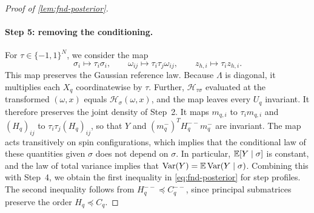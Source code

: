 \begin{proof}[Proof of \cref{lem:fnd-posterior}]
\paragraph{Step 5: removing the conditioning.}
For $\tau\in\{-1,1\}^N$, we consider the map
\[
 \sigma_i\mapsto\tau_i\sigma_i,\qquad
 \omega_{ij}\mapsto\tau_i\tau_j\omega_{ij},\qquad
 z_{h,i}\mapsto\tau_iz_{h,i}.
\]
This map preserves the Gaussian reference law. Because $\Lambda$ is diagonal,
it multiplies each $X_q$ coordinatewise by $\tau$. Further,
$\mathcal H_{\tau\sigma}$ evaluated at the transformed $(\omega,x)$
equals $\mathcal H_\sigma(\omega,x)$, and the map leaves every $U_q$
invariant. It therefore preserves the joint density of Step~2. It maps
$m_{q,i}$ to $\tau_im_{q,i}$ and $(H_q)_{ij}$ to $\tau_i\tau_j(H_q)_{ij}$,
so that $Y$ and $(m_q^-)^TH_q^{--}m_q^-$ are invariant. The map acts
transitively on spin configurations, which implies that the conditional
law of these quantities given $\sigma$ does not depend on $\sigma$. In
particular, $\mathbb E[Y\mid\sigma]$ is constant, and the law of total variance
implies that $\operatorname{Var}(Y)=\mathbb E\operatorname{Var}(Y\mid\sigma)$. Combining this with Step~4, we
obtain the first inequality in
\eqref{eq:fnd-posterior} for step profiles. The second inequality follows
from $H_q^{--}\preceq C_q^{--}$,
since principal submatrices preserve the order $H_q\preceq C_q$.


\end{proof}
